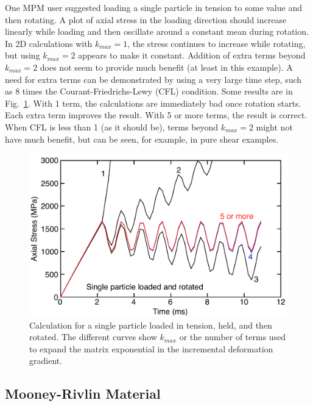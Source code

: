 \documentclass[11pt]{article}
\begin{document}
One MPM user suggested loading a single particle in tension to some value and then rotating. A plot of axial stress in the loading direction should increase linearly while loading and then oscillate around a constant mean during rotation. In 2D calculations with $k_{max}=1$, the stress continues to increase while rotating, but using $k_{max}=2$ appears to make it constant. Addition of extra terms beyond $k_{max}=2$ does not seem to provide much benefit (at least in this example). A need for extra terms can be demonstrated by using a very large time step, such as 8 times the Courant-Friedrichs-Lewy (CFL) condition. Some results are in Fig.~\ref{dFCalc}. With 1 term, the calculations are immediately bad once rotation starts. Each extra term improves the result. With 5 or more terms, the result is correct. When CFL is less than 1 (as it should be), terms beyond $k_{max}=2$ might not have much benefit, but can be seen, for example, in pure shear examples.
\begin{figure}
\begin{center}
\includegraphics[width=5in]{IncrementalDef}
\caption{Calculation for a single particle loaded in tension, held, and then rotated. The different curves show $k_{max}$ or the number of terms used to expand the matrix exponential in the incremental deformation gradient.}
\label{dFCalc}
\end{center}
\end{figure}

\subsection{Mooney-Rivlin Material}
\end{document}
